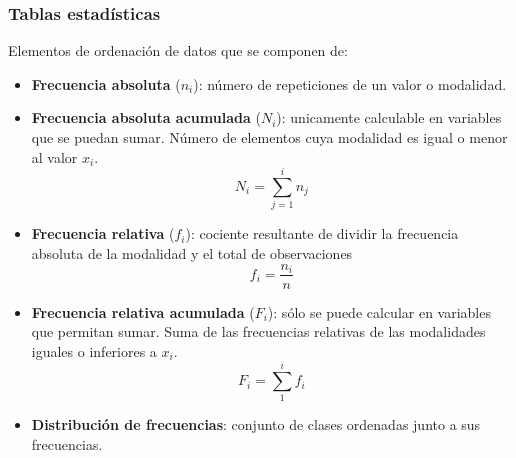 \subsubsection{Tablas estadísticas}
Elementos de ordenación de datos que se componen de:
\begin{itemize}[itemsep=0pt,parsep=0pt,topsep=0pt,partopsep=0pt]
    \item \textbf{Frecuencia absoluta} ($n_i$): número de repeticiones de un valor o modalidad.
    \item\textbf{Frecuencia absoluta acumulada} ($N_i$): unicamente calculable en variables que se puedan sumar. Número de elementos cuya modalidad es igual o menor al valor $x_i$.
        \[ N_i = \sum_{j=1}^{i}n_j \]
    \item\textbf{Frecuencia relativa} ($f_i$): cociente resultante de dividir la frecuencia absoluta de la modalidad y el total de observaciones
        \[ f_i = \dfrac{n_i}{n} \]
    \item\textbf{Frecuencia relativa acumulada} ($F_i$): sólo se puede calcular en variables que permitan sumar. Suma de las frecuencias relativas de las modalidades iguales o inferiores a $x_i$.
        \[ F_i = \sum_{1}^{i}f_i \]
    \item\textbf{Distribución de frecuencias}: conjunto de clases ordenadas junto a sus frecuencias.
\end{itemize}
